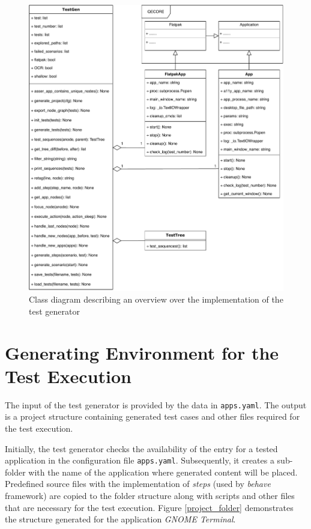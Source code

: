 \begin{figure}[H]
	\centering
	\includegraphics[width=1\textwidth,clip]{obrazky-figures/TestGen_class_diagram.pdf}
	\caption{Class diagram describing an overview over the implementation of the test generator}
	\label{test_gen}
\end{figure}

\newpage
\section{Generating Environment for the Test Execution}
The input of the test generator is provided by the data in \texttt{apps.yaml}. The output is a project structure containing generated test cases and other files required for the test execution. 

Initially, the test generator checks the availability of the entry for a tested application in the configuration file \texttt{apps.yaml}. Subsequently, it creates a sub-folder with the name of the application where generated content will be placed. Predefined source files with the implementation of \textit{steps} (used by \textit{behave} framework) are copied to the folder structure along with scripts and other files that are necessary for the test execution. Figure \ref{project_folder} demonstrates the structure generated for the application \textit{GNOME Terminal}.


